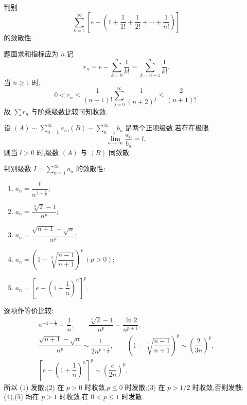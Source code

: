 \begin{example}
    判别
    \[
        \displaystyle\sum\limits_{k=1}^{\infty}\left[e-\left(1+\dfrac{1}{1!}+\dfrac{1}{2!}+\cdots+\dfrac{1}{n!}\right)\right]
    \]
    的敛散性.
\end{example}
\exampleblank

\begin{solution}
    题面求和指标应为 $n$.记
    \[
        r_n=e-\sum\limits_{k=0}^{n}\dfrac{1}{k!}
        =\sum\limits_{k=n+1}^{\infty}\dfrac{1}{k!}.
    \]
    当 $n\geq1$ 时,
    \[
        0<r_n\leq\dfrac{1}{(n+1)!}
        \sum\limits_{j=0}^{\infty}\dfrac{1}{(n+2)^j}
        \leq\dfrac{2}{(n+1)!}.
    \]
    故 $\displaystyle \sum r_n$ 与阶乘级数比较可知收敛.
\end{solution}




\begin{theorem}
    设 $\displaystyle(A)\sim\sum\limits_{n=1}^{\infty}a_n$,$\displaystyle(B)\sim\sum\limits_{n=1}^{\infty}b_n$ 是两个正项级数,若存在极限
    \[
        \displaystyle\lim\limits_{n\to\infty}\dfrac{a_n}{b_n}=l,
    \]
    则当 $l>0$ 时,级数 $(A)$ 与 $(B)$ 同敛散.
\end{theorem}

\begin{example}
    判别级数 $\displaystyle I=\sum\limits_{n=1}^{\infty}a_n$ 的敛散性:
    \begin{enumerate}
        \item $\displaystyle a_n=\dfrac{1}{n^{1+\frac{1}{n}}}$;
        \item $\displaystyle a_n=\dfrac{\sqrt[n]{2}-1}{n^p}$;
        \item $\displaystyle a_n=\dfrac{\sqrt{n+1}-\sqrt n}{n^p}$;
        \item $\displaystyle a_n=\left(1-\sqrt[3]{\dfrac{n-1}{n+1}}\right)^p\,(p>0)$;
        \item $\displaystyle a_n=\left[e-\left(1+\dfrac{1}{n}\right)^n\right]^p$.
    \end{enumerate}
\end{example}
\exampleblank

\begin{solution}
    逐项作等价比较:
    \[
        \begin{gathered}
            n^{-1-\frac{1}{n}}\sim\dfrac{1}{n},
            \qquad
            \dfrac{\sqrt[n]2-1}{n^p}\sim\dfrac{\ln2}{n^{p+1}},\\
            \dfrac{\sqrt{n+1}-\sqrt n}{n^p}\sim\dfrac{1}{2n^{p+\frac{1}{2}}},
            \qquad
            \left(1-\sqrt[3]{\dfrac{n-1}{n+1}}\right)^p
            \sim\left(\dfrac{2}{3n}\right)^p,\\
            \left[e-\left(1+\dfrac{1}{n}\right)^n\right]^p
            \sim\left(\dfrac{e}{2n}\right)^p.
        \end{gathered}
    \]
    所以 (1) 发散;(2) 在 $p>0$ 时收敛,$p\leq0$ 时发散;(3) 在
    $p>1/2$ 时收敛,否则发散;(4),(5) 均在 $p>1$ 时收敛,在
    $0<p\leq1$ 时发散.
\end{solution}

